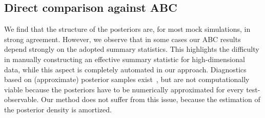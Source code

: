 \documentclass{article}
\begin{document}
\subsection{Direct comparison against ABC}
We find that the structure of the posteriors are, for most mock simulations, in strong agreement.
However, we observe that in some cases our ABC results depend strongly on the adopted summary statistics. 
This highlights the difficulty in
manually constructing an effective summary statistic for high-dimensional data, while this aspect is
completely automated in our approach.
Diagnostics based on (approximate) posterior samples exist~\citep{sbc},
but are not computationally
viable because the posteriors have to be numerically approximated for every test-observable.
Our method does not suffer from this issue, because the estimation of the
posterior density is amortized.
%
\end{document}
